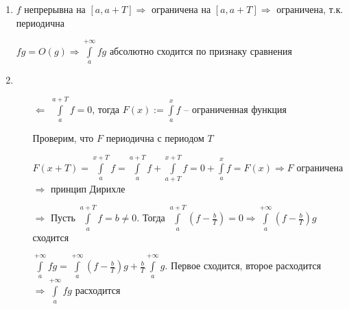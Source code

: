 \documentclass[12pt]{article}
\begin{document}
\begin{enumerate}
    \item $f$ непрерывна на $[a, a + T] \Rightarrow$ ограничена на $[a, a + T] \Rightarrow$ ограничена, т.к. периодична

    $fg = O(g) \Rightarrow \int\limits_a^{+ \infty} fg$ абсолютно сходится по признаку сравнения

    \item 
    
    \begin{itemize}
        \item[$\Leftarrow$] $\int\limits_a^{a + T} f = 0$, тогда $F(x) := \int\limits_a^x f$ -- ограниченная функция
        
        Проверим, что $F$ периодична с периодом $T$

        $F(x + T) = \int\limits_a^{x + T} f = \int\limits_a^{a + T} f + \int\limits_{a + T}^{x + T} f = 0 + \int\limits_a^{x} f = F(x) \Rightarrow F$ ограничена $\Rightarrow$ принцип Дирихле

        \item[$\Rightarrow$] Пусть $\int\limits_a^{a + T} f = b \neq 0$. Тогда $\int\limits_a^{a + T} (f - \frac{b}{T}) = 0 \Rightarrow \int\limits_a^{+ \infty} (f - \frac{b}{T})g$ сходится 
        
        $\int\limits_a^{+ \infty} fg = \int\limits_a^{+ \infty} (f - \frac{b}{T})g + \frac{b}{T}\int\limits_a^{+ \infty} g$. Первое сходится, второе расходится $\Rightarrow \int\limits_a^{+ \infty} fg$ расходится
    \end{itemize}
\end{enumerate}
\end{document}

